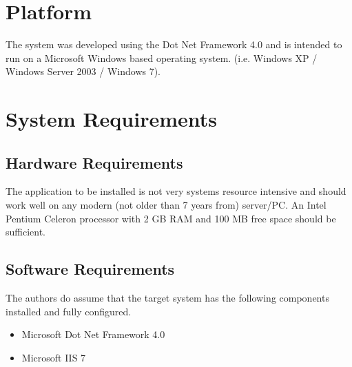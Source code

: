 \documentclass[a4paper,12pt]{article}
\begin{document}
\section{Platform}
The system was developed using the Dot Net Framework 4.0\cite{dotNet} and is intended to run on a Microsoft Windows\cite{windows} based operating system. (i.e. Windows XP / Windows Server 2003 / Windows 7). 


\section{System Requirements}
\subsection{Hardware Requirements}
The application to be installed is not very systems resource intensive and should work well on any modern (not older than 7 years from) server/PC. An Intel Pentium Celeron processor with 2 GB RAM and 100 MB free space should be sufficient. 
\subsection{Software Requirements}
The authors do assume that the target system has the following components installed and fully configured.
\begin{itemize}

\item Microsoft Dot Net Framework 4.0 \cite{dotNet}
\item Microsoft IIS 7 \cite{iis}

\end{itemize}
\end{document}
